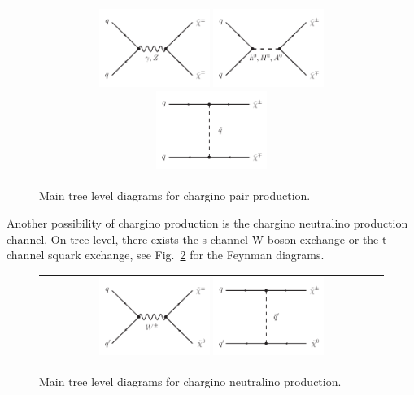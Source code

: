 \begin{figure}[!hb]
  \centering 
  \begin{tabular}{c}
    \includegraphics[width=0.33\textwidth]{figures/analysis/ChiChi_GammaZ.pdf}
    \includegraphics[width=0.33\textwidth]{figures/analysis/ChiChi_Scalar.pdf}
    \includegraphics[width=0.33\textwidth]{figures/analysis/ChiChi_Squark.pdf}
  \end{tabular}
  \caption{Main tree level diagrams for chargino pair production.}
  \label{fig:FeynmanDiagramProductionCharginoPair}
\end{figure}
Another possibility of chargino production is the chargino neutralino production channel. 
On tree level, there exists the s-channel W boson exchange or the t-channel squark exchange, see Fig.~\ref{fig:FeynmanDiagramProductionCharginoNeutralino} for the Feynman diagrams.
\begin{figure}[!hb]
  \centering 
  \begin{tabular}{c}
    \includegraphics[width=0.33\textwidth]{figures/analysis/ChiChi0_WBoson.pdf}
    \includegraphics[width=0.33\textwidth]{figures/analysis/ChiChi0_Squark.pdf}
  \end{tabular}
  \caption{Main tree level diagrams for chargino neutralino production.}
  \label{fig:FeynmanDiagramProductionCharginoNeutralino}
\end{figure}









